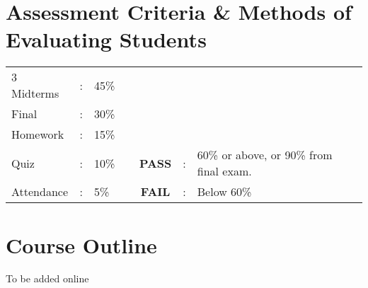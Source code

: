 \documentclass[handout]{ximera}
\begin{document}
\section*{Assessment Criteria \& Methods of Evaluating Students}

\begin{tabular}[c]{lllcccl}
3 Midterms  & : & 45\% & \,\hspace{2cm} &  & & \\  
Final & : & 30\% & \hspace{2cm} & & & \\  
Homework & : & 15\% & \hspace{2cm} & & & \\  
Quiz & : & 10\% & \hspace{2cm} & {\bf PASS}& :& 60\% or above, or 90\% from final exam.\\  
Attendance & : & 5\% & \hspace{2cm} & {\bf FAIL}& : & Below 60\%\\  
\end{tabular}


\section*{Course Outline}

To be added online


\end{document}
